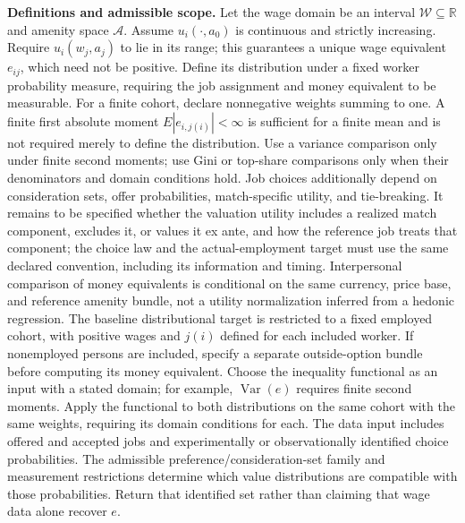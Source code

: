 \documentclass[11pt,a4paper]{article}
\begin{document}
\textbf{Definitions and admissible scope.} Let the wage domain be an interval \(\mathcal W\subseteq\mathbb R\) and amenity space \(\mathcal A\). Assume \(u_i(\cdot,a_0)\) is continuous and strictly increasing. Require \(u_i(w_j,a_j)\) to lie in its range; this guarantees a unique wage equivalent \(e_{ij}\), which need not be positive. Define its distribution under a fixed worker probability measure, requiring the job assignment and money equivalent to be measurable. For a finite cohort, declare nonnegative weights summing to one. A finite first absolute moment \(E|e_{i,j(i)}|<\infty\) is sufficient for a finite mean and is not required merely to define the distribution. Use a variance comparison only under finite second moments; use Gini or top-share comparisons only when their denominators and domain conditions hold. Job choices additionally depend on consideration sets, offer probabilities, match-specific utility, and tie-breaking. It remains to be specified whether the valuation utility includes a realized match component, excludes it, or values it ex ante, and how the reference job treats that component; the choice law and the actual-employment target must use the same declared convention, including its information and timing. Interpersonal comparison of money equivalents is conditional on the same currency, price base, and reference amenity bundle, not a utility normalization inferred from a hedonic regression. The baseline distributional target is restricted to a fixed employed cohort, with positive wages and \(j(i)\) defined for each included worker. If nonemployed persons are included, specify a separate outside-option bundle before computing its money equivalent. Choose the inequality functional as an input with a stated domain; for example, \(\operatorname{Var}(e)\) requires finite second moments. Apply the functional to both distributions on the same cohort with the same weights, requiring its domain conditions for each. The data input includes offered and accepted jobs and experimentally or observationally identified choice probabilities. The admissible preference/consideration-set family and measurement restrictions determine which value distributions are compatible with those probabilities. Return that identified set rather than claiming that wage data alone recover \(e\).
\end{document}
